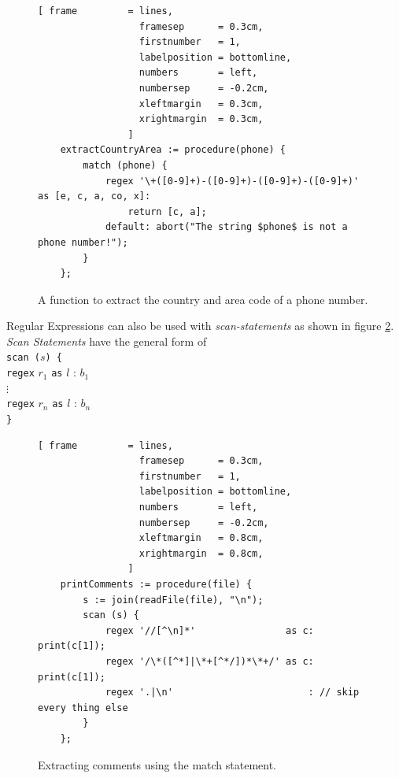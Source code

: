 \documentclass[11pt]{article}
\begin{document}
\begin{figure}[!ht]
\centering
\begin{Verbatim}[ frame         = lines, 
                  framesep      = 0.3cm, 
                  firstnumber   = 1,
                  labelposition = bottomline,
                  numbers       = left,
                  numbersep     = -0.2cm,
                  xleftmargin   = 0.3cm,
                  xrightmargin  = 0.3cm,
                ]
    extractCountryArea := procedure(phone) {
        match (phone) {
            regex '\+([0-9]+)-([0-9]+)-([0-9]+)-([0-9]+)' as [e, c, a, co, x]:
                return [c, a];
            default: abort("The string $phone$ is not a phone number!");
        }
    };
\end{Verbatim}
\vspace*{-0.3cm}
\caption{A function to extract the country and area code of a phone number.}
\label{fig:extract-phone-code.stlx}
\end{figure}
\pagebreak
Regular Expressions can also be used with \textsl{scan-statements} as shown in figure \ref{fig:find-comments-scan.stlx}. \textsl{Scan Statements} have the general form of
\\[0.2cm]
\hspace*{1.3cm} \texttt{scan ($s$) \{}  \\
\hspace*{1.8cm} \texttt{regex} $r_1$ \texttt{as} $l$ : $b_1$ \\
\hspace*{1.8cm} $\vdots$                                                  \\
\hspace*{1.8cm} \texttt{regex} $r_n$ \texttt{as} $l$ : $b_n$ \\
\hspace*{1.3cm} \texttt{\}}             
\\[0.2cm]

\begin{figure}[!ht]
\centering
\begin{Verbatim}[ frame         = lines, 
                  framesep      = 0.3cm, 
                  firstnumber   = 1,
                  labelposition = bottomline,
                  numbers       = left,
                  numbersep     = -0.2cm,
                  xleftmargin   = 0.8cm,
                  xrightmargin  = 0.8cm,
                ]
    printComments := procedure(file) {
        s := join(readFile(file), "\n");
        scan (s) {
            regex '//[^\n]*'                as c: print(c[1]);
            regex '/\*([^*]|\*+[^*/])*\*+/' as c: print(c[1]);
            regex '.|\n'                        : // skip every thing else
        }
    };
\end{Verbatim}
\vspace*{-0.3cm}
\caption{Extracting comments using the match statement.}
\label{fig:find-comments-scan.stlx}
\end{figure}
\end{document}
